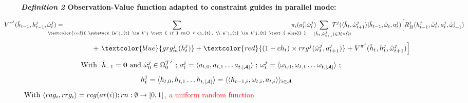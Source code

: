 \begin{figure}[h!]
\label{eq:single_value_function_parallel}
\raggedright
\textbf{\textit{Definition 2} \quad Observation-Value function adapted to constraint guides in parallel mode:}

\begin{scriptsize}
\vspace{-0.6cm}
\begin{gather*}
  \hspace{-1cm}V^{\pi^j}(\tilde{h}_{t-1},h^j_{t-1},\hat{\omega}^j_t) = \hspace{-0.95cm}
  \sum_{\textcolor{red}{ \substack{a^j_{t} \in A^j \text{ if } rn() < ch_{t}, \\
  a^j_{t} \in A^j_{t} \text{ else}}
  }}{\hspace{-0.9cm} \pi_i(a^j_{t} | \hat{\omega}^j_t)}
  \hspace {-1.2cm}
  \sum_{\phantom{XXXX}(\tilde{h}_t,\hat{\omega}^j_{t+1}) \in \mathcal{H} \times \hat{\Omega}^j}
  {\hspace{-1.2cm} \mathcal{T}^j(\langle \tilde{h}_t,\hat{\omega}^j_{t+1} \rangle | \tilde{h}_{t-1}, \hat{\omega}_t, a^j_ {t})
  \Bigl[R^j_H(h^j_{t-1},\hat{\omega}^j_t,a^j_t,\hat{\omega}^j_{t+1}) \hspace{-0.1cm} }
\end{gather*}
%
\vspace{-1cm}
\begin{gather*}
  \hspace{3cm}
  {+ \ \textcolor{blue}{grg^j_m(h^j_t)}
  +
  \textcolor{red}{(1-ch_t) \times rrg^j(\hat{\omega}^j_t,a^j_{t+1})} + V^{\pi^j}(\tilde{h}_{t}, h^j_t, \hat {\omega}^j_{t+1})\Bigr]}
\end{gather*}
%
\vspace{-0.15cm}
%
\[\hspace{-0.9cm}\text{With \ } \tilde{h}_{-1} = \mathbf{0} \text{ and } \tilde{\omega}^j_0 \in \Omega_0^{\mathcal{T}^j} \text{ ; } a^j_t = \langle a_{t,0}, a_{t,1} \dots a_{t,|\mathcal{A}|} \rangle \text{ ; } \omega^j_t = \langle \omega_{t,0}, \omega_{t,1} \dots \omega_{t,|\mathcal{A}|} \rangle \text{ ; }\]
%
\vspace{-0.25cm}
\[\hspace{-0.5cm} h^j_t = \langle h_{t,0}, h_{t,1} \dots h_{t,|\mathcal{A}|} \rangle = \langle \langle h_{t-1,i}, \omega_{t,i}, a_{t,i} \rangle \rangle_{i \in \mathcal{A}}\]
%
\vspace{-0.2cm}
\textcolor{red}{\hspace{-1cm}$\text{ \hspace{-0.1cm} With } \langle rag_i, rrg_i \rangle = rcg(ar(i)); rn: \emptyset \to [0,1[$, a uniform random function}

\end{scriptsize}
\end{figure}
